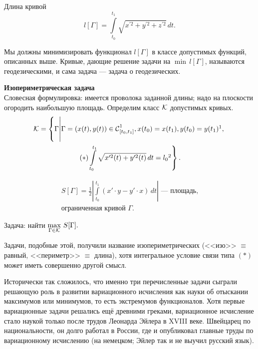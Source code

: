 \begin{enumerate2}
	Длина кривой 
	\begin{equation*}
		 l[\Gamma]=\int\limits_{t_0}^{t_1}\sqrt{x^{\prime 2}+y^{\prime 2}+z^{\prime 2}}\,dt.
	\end{equation*}

	Мы должны минимизировать функционал $l[\Gamma]$ в классе допустимых функций, описанных выше. Кривые, дающие решение задачи на $\min\,l[\Gamma]$, называются геодезическими, и сама задача --- задача о геодезических.
	
	\item \textbf{Изопериметрическая задача}\\
	Словесная формулировка: имеется проволока заданной длины; надо на плоскости огородить наибольшую площадь. Определим класс $\mathcal{K}$ допустимых кривых.
	\label{l1:eq:Isoperimetr} 
	\begin{multline*}
		\mc{K}=\left\{\Gamma\middle|\Gamma=(x(t),y(t))\in\Cfn[{[t_0,t_1]}]{1}, x(t_0)=x(t_1), y(t_0)=y(t_1)\footnotemark{},\vphantom{\int\limits_{t_0}^{t_1}}\right. \\\left.(*)\int\limits_{t_0}^{t_1}\sqrt{x^{\prime 2}(t)+y^{\prime 2}(t)}\,dt=l_0\footnotemark{}\right\}.
	\end{multline*}%
	\addtocounter{footnote}{-1}\addtocounter{footnote}{1}
	\begin{multline*}
		S[\Gamma]=\frac12\left|\int\limits_{t_0}^{t_1}\left(x'\cdot y-y'\cdot x\right)\,dt\right|\text{ --- площадь,}\\\text{ограниченная кривой }\Gamma.
	\end{multline*}
	
	Задача: найти $\max\limits_{\Gamma\in\mathcal{K}}\,S[\Gamma].$
	
	Задачи, подобные этой, получили название изопериметрических (<<изо>> $\equiv$ равный,  <<периметр>> $\equiv$ длина), хотя интегральное условие связи типа $(\hyperref[l1:eq:Isoperimetr]{*})$ может иметь совершенно другой смысл.
\end{enumerate2}

Исторически так сложилось, что именно три перечисленные задачи сыграли решающую роль в развитии вариационного исчисления как науки об отыскании максимумов или минимумов, то есть экстремумов функционалов. Хотя первые вариационные задачи решались ещё древними греками, вариационное исчисление стало наукой только после трудов Леонарда Эйлера в XVIII веке. Швейцарец по национальности{\mb,} он долго работал в России, где и опубликовал главные труды по вариационному исчислению (на немецком; Эйлер так и не выучил русский язык). 
\vfill
